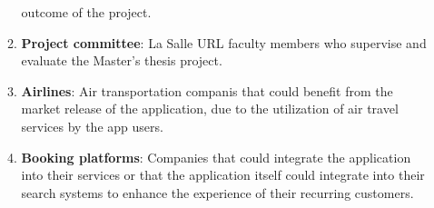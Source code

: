 \documentclass[../memory.tex]{subfiles}
\begin{document}
\begin{enumerate}[label = -]
\begin{enumerate}[label = -]
		            outcome of the project.
		      \item \textbf{Project committee}: La Salle URL faculty members who
		            supervise and evaluate the Master's thesis project.
		      \item \textbf{Airlines}: Air transportation companis that could
		            benefit from the market release of the application, due to the
		            utilization of air travel services by the app users.
		      \item \textbf{Booking platforms}: Companies that could integrate the
		            application into their services or that the application itself
		            could integrate into their search systems to enhance the
		            experience of their recurring customers.
	      \end{enumerate}
\end{enumerate}
\end{document}
